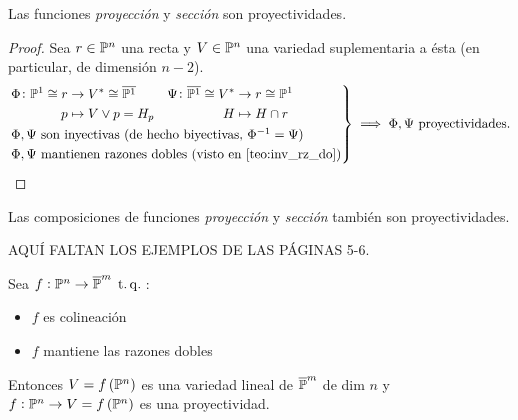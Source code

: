 \begin{col}
	Las funciones \textit{proyección} y \textit{sección} son proyectividades.
\end{col}
\begin{proof}
	Sea $r \in \mathbb{P}^n$ una recta y $V \in \mathbb{P}^n$ una variedad suplementaria a ésta
	(en particular, de dimensión $n-2$).
	\[
		\begin{rcases}
			\begin{aligned}
			\Phi \colon \mathbb{P}^1 \cong r &\to V^\ast \cong \overline{\mathbb{P}^1} \\
			p &\mapsto V \vee p = H_p
			\end{aligned}
			\quad
			\begin{aligned}
			\Psi \colon \overline{\mathbb{P}^1} \cong V^* &\to r \cong \mathbb{P}^1 \\ H &\mapsto H \cap r
			\end{aligned} \\
			\Phi, \Psi \text{ son inyectivas (de hecho biyectivas, } \Phi^{-1} = \Psi
			\text{)}\\
			\Phi, \Psi \text{ mantienen razones dobles (visto en \ref{teo:inv_rz_do})}
	\end{rcases}
	\implies
	\Phi, \Psi \text{ proyectividades.}
 \]
\end{proof}
\begin{obs}
	Las composiciones de funciones \textit{proyección} y \textit{sección} también son proyectividades.
\end{obs}
\begin{example} %
	AQUÍ FALTAN LOS EJEMPLOS DE LAS PÁGINAS 5-6.
\end{example}
\begin{prop} \label{prop:demo_teo2}
	Sea $f : \mathbb{P}^n \to \overline{\mathbb{P}}^m \operatorname{\;t.q.\;}$:
	\begin{itemize}
		\item $f$ es colineación
		\item $f$ mantiene las razones dobles
	\end{itemize}
	Entonces $V = f \left( \mathbb{P}^n \right)$ es una variedad lineal de $\overline{\mathbb{P}}^m$ de dim $n$ y $f : \mathbb{P}^n \to V = f \left( \mathbb{P}^n \right)$ es una proyectividad.
\end{prop}
